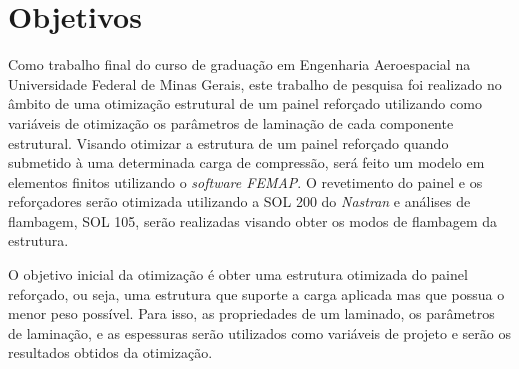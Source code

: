\chapter{Objetivos}

Como trabalho final do curso de graduação em Engenharia Aeroespacial na Universidade Federal de Minas Gerais, este trabalho de pesquisa foi realizado no âmbito de uma otimização estrutural de um painel reforçado utilizando como variáveis de otimização os parâmetros de laminação de cada componente estrutural.
Visando otimizar a estrutura de um painel reforçado quando submetido à uma determinada carga de compressão, será feito um modelo em elementos finitos utilizando o \emph{software FEMAP}. O revetimento do painel e os reforçadores serão otimizada utilizando a SOL 200 do \emph{Nastran} e análises de flambagem, SOL 105, serão realizadas visando obter os modos de flambagem da estrutura.

O objetivo inicial da otimização é obter uma estrutura otimizada do painel reforçado, ou seja, uma estrutura que suporte a carga aplicada mas que possua o menor peso possível. Para isso, as propriedades de um laminado, os parâmetros de laminação, e as espessuras serão utilizados como variáveis de projeto e serão os resultados obtidos da otimização.
